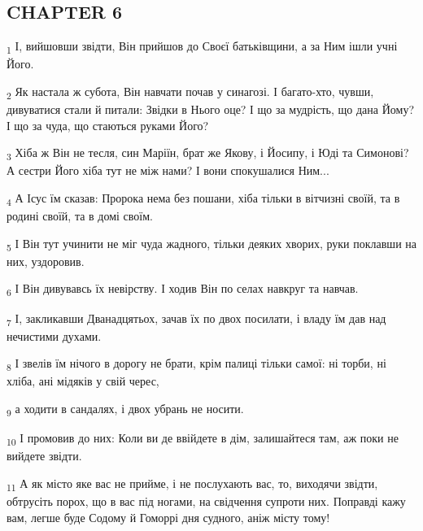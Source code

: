 \subsection{CHAPTER 6}
\begin{tcolorbox}
\textsubscript{1} І, вийшовши звідти, Він прийшов до Своєї батьківщини, а за Ним ішли учні Його.
\end{tcolorbox}
\begin{tcolorbox}
\textsubscript{2} Як настала ж субота, Він навчати почав у синагозі. І багато-хто, чувши, дивуватися стали й питали: Звідки в Нього оце? І що за мудрість, що дана Йому? І що за чуда, що стаються руками Його?
\end{tcolorbox}
\begin{tcolorbox}
\textsubscript{3} Хіба ж Він не тесля, син Маріїн, брат же Якову, і Йосипу, і Юді та Симонові? А сестри Його хіба тут не між нами? І вони спокушалися Ним...
\end{tcolorbox}
\begin{tcolorbox}
\textsubscript{4} А Ісус їм сказав: Пророка нема без пошани, хіба тільки в вітчизні своїй, та в родині своїй, та в домі своїм.
\end{tcolorbox}
\begin{tcolorbox}
\textsubscript{5} І Він тут учинити не міг чуда жадного, тільки деяких хворих, руки поклавши на них, уздоровив.
\end{tcolorbox}
\begin{tcolorbox}
\textsubscript{6} І Він дивувавсь їх невірству. І ходив Він по селах навкруг та навчав.
\end{tcolorbox}
\begin{tcolorbox}
\textsubscript{7} І, закликавши Дванадцятьох, зачав їх по двох посилати, і владу їм дав над нечистими духами.
\end{tcolorbox}
\begin{tcolorbox}
\textsubscript{8} І звелів їм нічого в дорогу не брати, крім палиці тільки самої: ні торби, ні хліба, ані мідяків у свій черес,
\end{tcolorbox}
\begin{tcolorbox}
\textsubscript{9} а ходити в сандалях, і двох убрань не носити.
\end{tcolorbox}
\begin{tcolorbox}
\textsubscript{10} І промовив до них: Коли ви де ввійдете в дім, залишайтеся там, аж поки не вийдете звідти.
\end{tcolorbox}
\begin{tcolorbox}
\textsubscript{11} А як місто яке вас не прийме, і не послухають вас, то, виходячи звідти, обтрусіть порох, що в вас під ногами, на свідчення супроти них. Поправді кажу вам, легше буде Содому й Гоморрі дня судного, аніж місту тому!
\end{tcolorbox}
